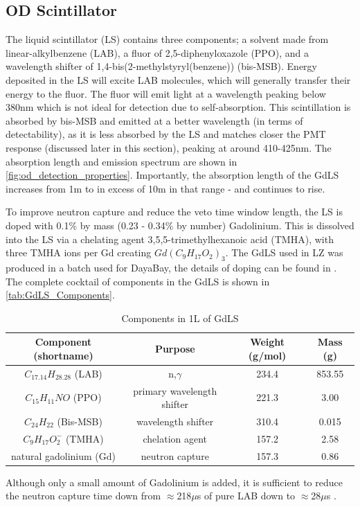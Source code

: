 \subsection{OD Scintillator}
\par
The liquid scintillator (LS) contains three components; a solvent made from linear-alkylbenzene (LAB), a fluor of 2,5-diphenyloxazole (PPO), and a wavelength shifter of 1,4-bis(2-methylstyryl(benzene)) (bis-MSB).
Energy deposited in the LS will excite LAB molecules, which will generally transfer their energy to the fluor. 
The fluor will emit light at a wavelength peaking below 380nm which is not ideal for detection due to self-absorption.
This scintillation is absorbed by bis-MSB and emitted at a better wavelength (in terms of detectability), as it is less absorbed by the LS and matches closer the PMT response (discussed later in this section), peaking at around 410-425nm.
The absorption length and emission spectrum are shown in \autoref{fig:od_detection_properties}.
Importantly, the absorption length of the GdLS increases from 1m to in excess of 10m in that range - and continues to rise.



\par
To improve neutron capture and reduce the veto time window length, the LS is doped with 0.1\% by mass (0.23 - 0.34\% by number) Gadolinium.
This is dissolved into the LS via a chelating agent 3,5,5-trimethylhexanoic acid (TMHA), with three TMHA ions per Gd creating $Gd({C}_{9}{H}_{17}{O}_{2})_{3}$.
The GdLS used in LZ was produced in a batch used for DayaBay, the details of doping can be found in \cite{dayabay_gd_doping_ref}.
The complete cocktail of components in the GdLS is shown in \autoref{tab:GdLS_Components}.

\begin{table}[!htbp]
    \centering
    \begin{tabular}{c | c | c | c}
    \hline
    {Component (shortname)} & {Purpose} & {Weight (g/mol)} & {Mass (g)} \\ \hline
    $C_{17.14}H_{28.28}$ (LAB) & n,$\gamma$ & 234.4  & 853.55 \\
    $C_{15}H_{11}NO$ (PPO) & primary wavelength shifter & 221.3 & 3.00 \\
    $C_{24}H_{22}$ (Bis-MSB) & wavelength shifter & 310.4 & 0.015 \\
    $C_{9}H_{17}O^{-}_{2}$ (TMHA) & chelation agent & 157.2 & 2.58 \\
    natural gadolinium (Gd) & neutron capture & 157.3 & 0.86 
    \end{tabular}
    \caption{Components in 1L of GdLS}
    \label{tab:GdLS_Components}
\end{table} 
\par
Although only a small amount of Gadolinium is added, it is sufficient to reduce the neutron capture time down from $\approx$218$\mu$s of pure LAB down to $\approx$28$\mu$s \cite{ucsb_gdls_dicebox_simulations_ref}.


